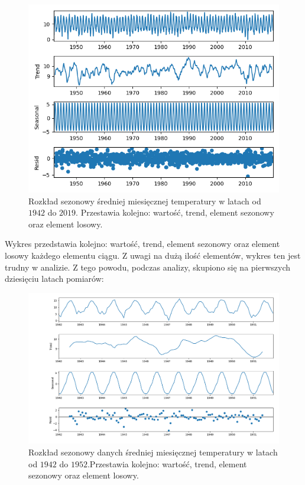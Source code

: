 \documentclass[12pt]{article}
\begin{document}
\begin{figure}[H]
    \includegraphics[width=\textwidth]{img/decomposition.png}
    \caption{Rozkład sezonowy średniej miesięcznej temperatury w latach od $1942$ do $2019$.
        Przestawia kolejno: wartość, trend, element sezonowy oraz element losowy.}
\end{figure}

Wykres przedstawia kolejno: wartość, trend, element sezonowy oraz element losowy każdego elementu ciągu. Z uwagi na dużą ilość elementów, wykres ten jest trudny w analizie. Z tego powodu, podczas analizy, skupiono się na pierwszych dziesięciu latach pomiarów:

\begin{figure}[H]
    \includegraphics[width=\textwidth]{img/decomposition_10y.png}
    \caption{Rozkład sezonowy danych średniej miesięcznej temperatury w latach od $1942$ do $1952$.Przestawia kolejno: wartość, trend, element sezonowy oraz element losowy.}
\end{figure}
\end{document}
